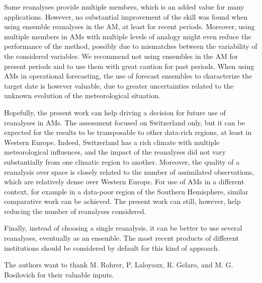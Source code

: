 \documentclass{ametsoc}
\begin{document}
Some reanalyses provide multiple members, which is an added value for many applications. However, no substantial improvement of the skill was found when using ensemble reanalyses in the AM, at least for recent periods. Moreover, using multiple members in AMs with multiple levels of analogy might even reduce the performance of the method, possibly due to mismatches between the variability of the considered variables. We recommend not using ensembles in the AM for present periods and to use them with great caution for past periods. When using AMs in operational forecasting, the use of forecast ensembles to characterize the target date is however valuable, due to greater uncertainties related to the unknown evolution of the meteorological situation.

Hopefully, the present work can help driving a decision for future use of reanalyses in AMs. The assessment focused on Switzerland only, but it can be expected for the results to be transposable to other data-rich regions, at least in Western Europe. Indeed, Switzerland has a rich climate with multiple meteorological influences, and the impact of the reanalyses did not vary substantially from one climatic region to another. Moreover, the quality of a reanalysis over space is closely related to the number of assimilated observations, which are relatively dense over Western Europe. For use of AMs in a different context, for example in a data-poor region of the Southern Hemisphere, similar comparative work can be achieved. The present work can still, however, help reducing the number of reanalyses considered.

Finally, instead of choosing a single reanalysis, it can be better to use several reanalyses, eventually as an ensemble. The most recent products of different institutions should be considered by default for this kind of approach.





%
\acknowledgments
The authors want to thank M. Rohrer, P. Laloyaux, R. Gelaro, and M. G. Bosilovich for their valuable inputs.
\end{document}
